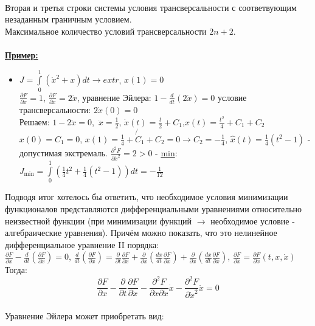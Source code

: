 \documentclass[preprint,russian,a5paper,10pt,twoside,mediummath]{ncc}
\newcommand{\ExampleMy}{\textbf{\underline{Пример:}}}
\begin{document}
\\Вторая и третья строки системы условия трансверсальности с соответвующим незаданным граничным условием.
\\Максимальное количество условий трансверсальности $2n+2$.
\\
\\
\ExampleMy 
\begin{itemize}
\item $J=\int\limits_{0}^{1}{\left( {{{\dot{x}}}^{2}}+x \right)dt}\to extr$, $x\left( 1 \right)=0$
\\$\frac{\partial F}{\partial x}=1$, $\frac{\partial F}{\partial \dot{x}}=2\dot{x}$, уравнение Эйлера: $1-\frac{d}{dt}\left( 2\dot{x} \right)=0$ условие трансверсальности: $2\dot{x}\left( 0 \right)=0$
\\Решаем: $1-2\ddot{x}=0$, $\,\ddot{x}=\frac{1}{2}$, $\dot{x}\left( t \right)=\frac{t}{2}+{{C}_{1}}$,$x\left( t \right)=\frac{{{t}^{2}}}{4}+{{C}_{1}}+{{C}_{2}}$
\\$x\left( 0 \right)={{C}_{1}}=0$, $x\left( 1 \right)=\frac{1}{4}+{{\not{C}}_{1}}+{{C}_{2}}=0\to {{C}_{2}}=-\frac{1}{4}$, $\hat{x}\left( t \right)=\frac{1}{4}\left( {{t}^{2}}-1 \right)$ - допустимая экстремаль.  
$\frac{{{\partial }^{2}}F}{\partial {{{\dot{x}}}^{2}}}=2>0$ - \underline{min}: ${{J}_{\min }}=\int\limits_{0}^{1}{\left( \frac{1}{4}{{t}^{2}}+\frac{1}{4}\left( {{t}^{2}}-1 \right) \right)dt=-\frac{1}{12}}$ 
\end{itemize}
Подводя итог хотелось бы ответить, что необходимое условия минимизации функционалов представляются дифференциальными уравнениями относительно неизвестной функции (при минимизации функций $\to $ необходимое условие - алгебраические уравнения). Причём можно показать, что это нелинейное дифференциальное уравнение II порядка:
\\$\frac{\partial F}{\partial x}-\frac{d}{dt}\left( \frac{\partial F}{\partial \dot{x}} \right)=0$, $\frac{d}{dt}\left( \frac{\partial F}{\partial \dot{x}} \right)=\frac{\partial }{\partial t}\frac{\partial F}{\partial \dot{x}}+\frac{\partial }{\partial x}\left( \frac{dx}{dt}\frac{\partial F}{\partial \dot{x}} \right)+\frac{\partial }{\partial \dot{x}}\left( \frac{dx}{dt}\frac{\partial F}{\partial \dot{x}} \right)$, $\frac{\partial F}{\partial \dot{x}}=\frac{\partial F}{\partial \dot{x}}\left( t,x,\dot{x} \right)$
\\Тогда: \[\frac{\partial F}{\partial x}-\frac{\partial }{\partial t}\frac{\partial F}{\partial \dot{x}}-\frac{{{\partial }^{2}}F}{\partial \dot{x}\partial \dot{x}}\dot{x}-\frac{{{\partial }^{2}}F}{\partial {{{\dot{x}}}^{2}}}\ddot{x}=0\]
\\Уравнение Эйлера может приобретать вид:
\end{document}
